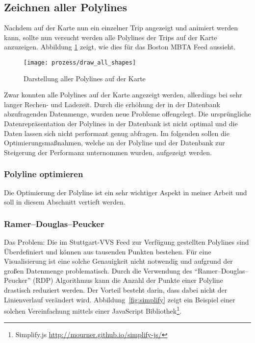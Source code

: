 \subsection{Zeichnen aller Polylines}
\label{sub:zeichnen_aller_polylines}
  Nachdem auf der Karte nun ein einzelner Trip angezeigt und animiert werden kann, sollte nun versucht werden alle Polylines der Trips auf der Karte anzuzeigen. Abbildung \ref{fig:prozess/draw_all_shapes} zeigt, wie dies für das Boston MBTA Feed aussieht.

  \begin{figure}[htbp]
    \begin{center}
      \texttt{[image: prozess/draw\_all\_shapes]}
      \caption{Darstellung aller Polylines auf der Karte}
      \label{fig:prozess/draw_all_shapes}
    \end{center}
  \end{figure}
  
  Zwar konnten alle Polylines auf der Karte angezeigt werden, allerdings bei sehr langer Rechen- und Ladezeit. Durch die erhöhung der in der Datenbank abzufragenden Datenmenge, wurden neue Probleme offengelegt. Die ursprüngliche Datenrepräsentation der Polylines in der Datenbank ist nicht optimal und die Daten lassen sich nicht performant genug abfragen. Im folgenden sollen die Optimierungsmaßnahmen, welche an der Polyline und der Datenbank zur Steigerung der Performanz unternommen wurden, aufgezeigt werden.

  \subsubsection{Polyline optimieren}
  \label{ssub:polyline_optimieren}

    Die Optimierung der Polyline ist ein sehr wichtiger Aspekt in meiner Arbeit und soll in diesem Abschnitt vertieft werden. 

    \subsubsection*{Ramer–Douglas–Peucker}
    \label{ssub:ramer_douglas_peucker}
      Das Problem: Die im Stuttgart-VVS Feed zur Verfügung gestellten Polylines sind Überdefiniert und können aus tausenden Punkten bestehen. Für eine Visualisierung ist eine solche Genauigkeit nicht notwendig und aufgrund der großen Datenmenge problematisch. Durch die Verwendung des "`Ramer–Douglas–Peucker"' (RDP) Algorithmus kann die Anzahl der Punkte einer Polyline drastisch reduziert werden. Der Vorteil besteht darin, dass dabei nicht der Linienverlauf verändert wird. Abbildung~\ref{fig:simplify} zeigt ein Beispiel einer solchen Vereinfachung mittels einer JavaScript Bibliothek\footnote{Simplify.js \url{http://mourner.github.io/simplify-js/}}.

